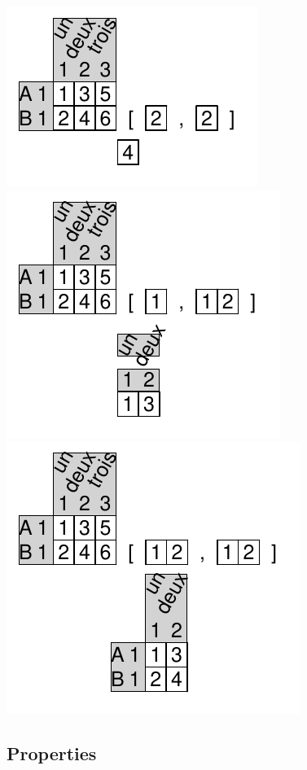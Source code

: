 \documentclass[pdflatex]{article}
\begin{document}
\includegraphics{matrix_extraction8}
\includegraphics{matrix_extraction6}
\includegraphics{matrix_extraction7}

\subsection{Properties}
\end{document}

